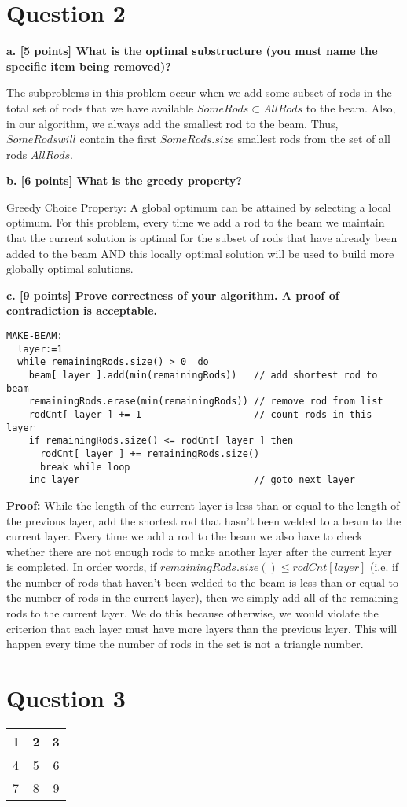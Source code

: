 \documentclass[12pt]{article}
\begin{document}
\section*{Question 2}
\textbf{a. [5 points] What is the optimal substructure (you must name the specific item being removed)?}

The subproblems in this problem occur when we add some subset of rods in the total set of rods that we have available $SomeRods \subset AllRods$ to the beam. Also, in our algorithm, we always add the smallest rod to the beam. Thus, $SomeRodswill$ contain the first $SomeRods.size$ smallest rods from the set of all rods $AllRods$. 

\noindent \textbf{b. [6 points] What is the greedy property? }

Greedy Choice Property: A global optimum can be attained by selecting a local optimum. For this problem, every time we add a rod to the beam we maintain that the current solution is optimal for the subset of rods that have already been added to the beam AND this locally optimal solution will be used to build more globally optimal solutions. 

\newpage
\noindent \textbf{c. [9 points] Prove correctness of your algorithm. A proof of contradiction is acceptable.}
\begin{lstlisting}[frame=single]
MAKE-BEAM:
  layer:=1                                                        
  while remainingRods.size() > 0  do 
    beam[ layer ].add(min(remainingRods))   // add shortest rod to beam
    remainingRods.erase(min(remainingRods)) // remove rod from list
    rodCnt[ layer ] += 1                    // count rods in this layer
    if remainingRods.size() <= rodCnt[ layer ] then
      rodCnt[ layer ] += remainingRods.size()
      break while loop 
    inc layer                               // goto next layer
\end{lstlisting}

\textbf{Proof: } While the length of the current layer is less than or
equal to the length of the previous layer, add the shortest rod that hasn't 
been welded to a beam to the current layer. 
Every time we add a rod to the beam we also have to check whether there 
are not enough rods to make another layer after the current layer is completed. 
In order words, if $ remainingRods.size() \le rodCnt[ layer ] $
(i.e. if the number of rods that haven't been welded to the beam is less than 
or equal to the number of rods in the current layer), 
then we simply add all of the 
remaining rods to the current layer. We do this because otherwise, we would 
violate the criterion that each layer must have more layers than the 
previous layer. 
This will happen every time the number of rods in the set is not a triangle 
number.


\section*{Question 3}

\begin{center}
  \begin{tabular}{ | l | c | r | }
    \hline
    1 & 2 & 3 \\ \hline
    4 & 5 & 6 \\ \hline
    7 & 8 & 9 \\
    \hline
  \end{tabular}
\end{center}
\end{document}
